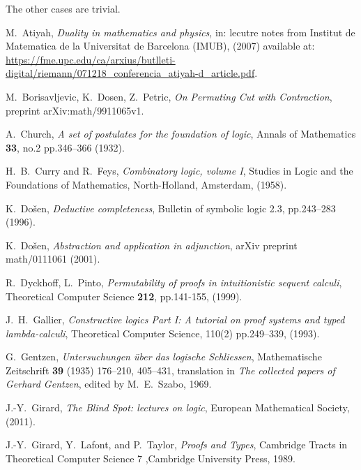 \documentclass[english,letter paper,12pt,leqno]{article}
\theoremstyle{example}
\numberwithin{equation}{section}
\begin{document}
The other cases are trivial.


\providecommand{\bysame}{\leavevmode\hbox to3em{\hrulefill}\thinspace}
\providecommand{\href}[2]{#2}
\begin{thebibliography}{BHLS03}
	
	M.~Atiyah, \textsl{Duality in mathematics and physics}, in: lecutre notes from Institut de Matematica de la Universitat de Barcelona (IMUB), (2007) available at: \url{https://fme.upc.edu/ca/arxius/butlleti-digital/riemann/071218_conferencia_atiyah-d_article.pdf}.
	
	M.~Borisavljevic, K.~Dosen, Z.~Petric, \textsl{On Permuting Cut with Contraction}, preprint arXiv:math/9911065v1.
	
	A.~Church, \textsl{A set of postulates for the foundation of logic}, Annals of Mathematics \textbf{33}, no.2 pp.346--366 (1932).
	
	H.~B.~Curry and R.~Feys, \textsl{Combinatory logic, volume I}, Studies in Logic and the Foundations of Mathematics, North-Holland, Amsterdam, (1958).
	
	K.~Do\v{s}en, \textsl{Deductive completeness}, Bulletin of symbolic logic 2.3, pp.243--283 (1996).
	
	K.~Do\v{s}en, \textsl{Abstraction and application in adjunction}, arXiv preprint math/0111061 (2001).
	
	R.~Dyckhoff, L.~Pinto, \textsl{Permutability of proofs in intuitionistic sequent calculi}, Theoretical Computer Science \textbf{212}, pp.141-155, (1999).
	
	J.~H.~Gallier, \textsl{Constructive logics Part I: A tutorial on proof systems and typed lambda-calculi}, Theoretical Computer Science, 110(2) pp.249--339, (1993).
	
	G.~Gentzen, \textsl{Untersuchungen \"uber das logische Schliessen}, Mathematische Zeitschrift \textbf{39} (1935) 176--210, 405--431, translation in \textsl{The collected papers of Gerhard Gentzen}, edited by M.~E.~Szabo, 1969.
	
	J.-Y.~Girard, \textsl{The Blind Spot: lectures on logic}, European Mathematical Society, (2011).
	
	J.-Y.~Girard, Y.~Lafont, and P.~Taylor, \textsl{Proofs and Types}, Cambridge Tracts in Theoretical Computer Science 7 ,Cambridge University Press, 1989.
	

\end{thebibliography}
\end{document}
